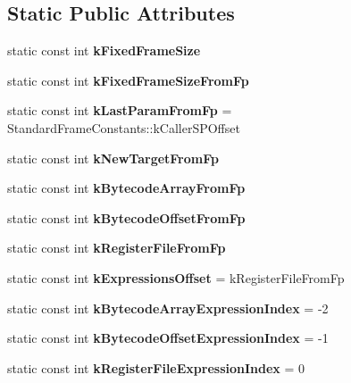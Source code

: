 \subsection*{Static Public Attributes}
\begin{DoxyCompactItemize}
\item 
static const int {\bfseries k\+Fixed\+Frame\+Size}
\item 
static const int {\bfseries k\+Fixed\+Frame\+Size\+From\+Fp}
\item 
static const int {\bfseries k\+Last\+Param\+From\+Fp} = Standard\+Frame\+Constants\+::k\+Caller\+S\+P\+Offset\hypertarget{classv8_1_1internal_1_1_interpreter_frame_constants_af099424733aef81f23090b4057a3e752}{}\label{classv8_1_1internal_1_1_interpreter_frame_constants_af099424733aef81f23090b4057a3e752}

\item 
static const int {\bfseries k\+New\+Target\+From\+Fp}
\item 
static const int {\bfseries k\+Bytecode\+Array\+From\+Fp}
\item 
static const int {\bfseries k\+Bytecode\+Offset\+From\+Fp}
\item 
static const int {\bfseries k\+Register\+File\+From\+Fp}
\item 
static const int {\bfseries k\+Expressions\+Offset} = k\+Register\+File\+From\+Fp\hypertarget{classv8_1_1internal_1_1_interpreter_frame_constants_a868c344c2e0e504252b3c94d49b951aa}{}\label{classv8_1_1internal_1_1_interpreter_frame_constants_a868c344c2e0e504252b3c94d49b951aa}

\item 
static const int {\bfseries k\+Bytecode\+Array\+Expression\+Index} = -\/2\hypertarget{classv8_1_1internal_1_1_interpreter_frame_constants_af347ea5bb9bb6c4f215263883534ee78}{}\label{classv8_1_1internal_1_1_interpreter_frame_constants_af347ea5bb9bb6c4f215263883534ee78}

\item 
static const int {\bfseries k\+Bytecode\+Offset\+Expression\+Index} = -\/1\hypertarget{classv8_1_1internal_1_1_interpreter_frame_constants_a20cac787c95ccf53ebb00d48d57fe7ff}{}\label{classv8_1_1internal_1_1_interpreter_frame_constants_a20cac787c95ccf53ebb00d48d57fe7ff}

\item 
static const int {\bfseries k\+Register\+File\+Expression\+Index} = 0\hypertarget{classv8_1_1internal_1_1_interpreter_frame_constants_a79943a6341c1a2ecbd542c1a42a3f097}{}\label{classv8_1_1internal_1_1_interpreter_frame_constants_a79943a6341c1a2ecbd542c1a42a3f097}

\end{DoxyCompactItemize}


